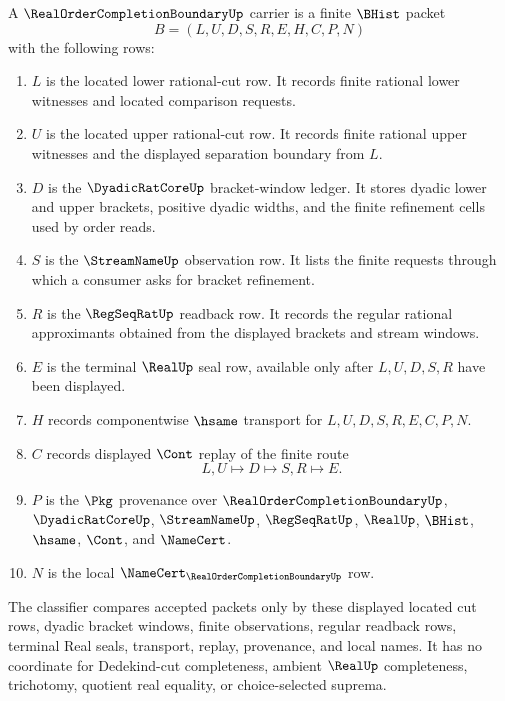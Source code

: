 \begin{definition}
\label{def:real-order-completion-carrier}
A $\RealOrderCompletionBoundaryUp$ carrier is a finite $\BHist$ packet
$$
B=(L,U,D,S,R,E,H,C,P,N)
$$
with the following rows:
\begin{enumerate}
\item $L$ is the located lower rational-cut row. It records finite rational lower witnesses and located comparison requests.
\item $U$ is the located upper rational-cut row. It records finite rational upper witnesses and the displayed separation boundary from $L$.
\item $D$ is the $\DyadicRatCoreUp$ bracket-window ledger. It stores dyadic lower and upper brackets, positive dyadic widths, and the finite refinement cells used by order reads.
\item $S$ is the $\StreamNameUp$ observation row. It lists the finite requests through which a consumer asks for bracket refinement.
\item $R$ is the $\RegSeqRatUp$ readback row. It records the regular rational approximants obtained from the displayed brackets and stream windows.
\item $E$ is the terminal $\RealUp$ seal row, available only after $L,U,D,S,R$ have been displayed.
\item $H$ records componentwise $\hsame$ transport for $L,U,D,S,R,E,C,P,N$.
\item $C$ records displayed $\Cont$ replay of the finite route
$$
L,U \longmapsto D \longmapsto S,R \longmapsto E .
$$
\item $P$ is the $\Pkg$ provenance over $\RealOrderCompletionBoundaryUp$, $\DyadicRatCoreUp$, $\StreamNameUp$, $\RegSeqRatUp$, $\RealUp$, $\BHist$, $\hsame$, $\Cont$, and $\NameCert$.
\item $N$ is the local $\NameCert_{\RealOrderCompletionBoundaryUp}$ row.
\end{enumerate}
The classifier compares accepted packets only by these displayed located cut rows, dyadic bracket windows, finite observations, regular readback rows, terminal Real seals, transport, replay, provenance, and local names. It has no coordinate for Dedekind-cut completeness, ambient $\RealUp$ completeness, trichotomy, quotient real equality, or choice-selected suprema.
\end{definition}

